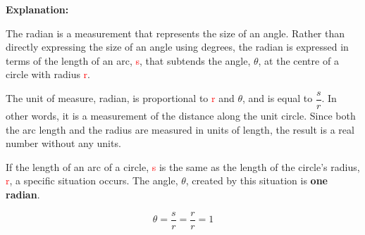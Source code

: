 \documentclass[12pt]{book}
\begin{document}
\begin{enumerate}
\textbf{Explanation:}\\
\begin{minipage}{.5\textwidth}
The radian is a measurement that represents the size of an angle. Rather than directly expressing the size of an angle using degrees, the radian is expressed in terms of the length of an arc, \textcolor{red}{s}, that subtends the angle, $\theta$, at  the centre of a circle with radius \textcolor{red}{r}.\\
\end{minipage}
\begin{minipage}{0.5\textwidth}
    \begin{figure}[H]
    \end{figure} 
\end{minipage}
The unit of measure, radian, is proportional to \textcolor{red}{r} and $\theta$, and is equal to $\dfrac{s}{r}$. In other words, it is a measurement of the distance along the unit circle. Since both the arc length and the radius are measured in units of length, the result is a real number without any units.\\
\begin{minipage}{.5\textwidth}
    If the length of an arc of a circle, \textcolor{red}{s} is the same as the length of the circle's radius, \textcolor{red}{r}, a specific situation occurs. The angle, $\theta$, created by this situation is \textbf{one radian}.
    
    $$\theta = \dfrac{s}{r} = \dfrac{r}{r} = 1$$
\end{minipage}
\begin{minipage}{.5\textwidth}
    \begin{figure}[H]
    \end{figure} 
\end{minipage}\\


\end{enumerate}
\end{document}
